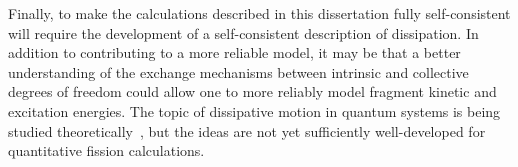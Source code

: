 
Finally, to make the calculations described in this dissertation fully self-consistent will require the development of a self-consistent description of dissipation. In addition to contributing to a more reliable model, it may be that a better understanding of the exchange mechanisms between intrinsic and collective degrees of freedom could allow one to more reliably model fragment kinetic and excitation energies. The topic of dissipative motion in quantum systems is being studied theoretically~\cite{Koch2008, Lacroix2008, Hupin2010, Sargsyan2010}, but the ideas are not yet sufficiently well-developed for quantitative fission calculations.




